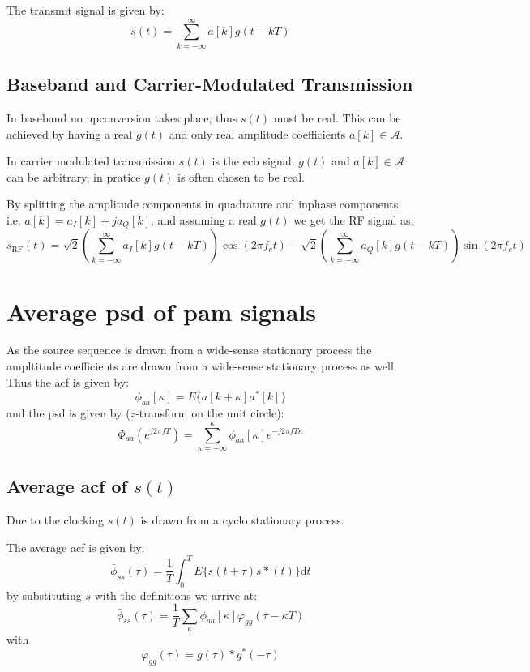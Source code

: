 The transmit signal is given by:
\begin{equation}
    s(t) = \sum_{k=-\infty}^\infty a[k] g(t - k T)
\end{equation}

\subsection{Baseband and Carrier-Modulated Transmission}
In baseband no upconversion takes place, thus $s(t)$ must be real. This can be achieved
by having a real $g(t)$ and only real amplitude coefficients $a[k] \in \mathcal{A}$.

In carrier modulated transmission $s(t)$ is the \ac{ecb} signal. $g(t)$ and
$a[k] \in \mathcal{A}$ can be arbitrary, in pratice $g(t)$ is often chosen to be real.

By splitting the amplitude components in quadrature and inphase components, i.e.
$a[k] = a_I[k] + j a_Q[k]$, and assuming a real $g(t)$  we get the RF signal as:
\begin{equation}
    s_\text{RF}(t) = \sqrt{2} \left(\sum_{k=-\infty}^\infty a_I[k] g(t-kT)
        \right) \cos(2 \pi f_c t)
        - \sqrt{2} \left(\sum_{k=-\infty}^\infty a_Q[k] g(t-kT)\right)
            \sin(2 \pi f_c t)
\end{equation}

\section{Average \acl{psd} of \acl{pam} signals}
As the source sequence is drawn from a wide-sense stationary process the ampltitude
coefficients are drawn from a wide-sense stationary process as well. Thus the
\ac{acf} is given by:
\begin{equation}
    \phi_{aa}[\kappa] = E\{a[k + \kappa] a^*[k]\}
\end{equation}
and the \ac{psd} is given by ($z$-transform on the unit circle):
\begin{equation}
    \Phi_{aa}(e^{j 2 \pi f T}) = \sum_{\kappa = -\infty}^\kappa \phi_{aa}[\kappa] e^{-j 2 \pi f T \kappa}
\end{equation}

\subsection{Average \acl{acf} of $s(t)$}
Due to the clocking $s(t)$ is drawn from a cyclo stationary process.

The average \ac{acf} is given by:
\begin{equation}
    \bar{\phi}_{ss}(\tau) = \frac{1}{T} \int_0^T E\{s(t+\tau)s*(t)\} \text{d}t
\end{equation}
by substituting $s$ with the definitions we arrive at:
\begin{equation}
    \bar{\phi}_{ss}(\tau) =  \frac{1}{T} \sum_{\kappa} \phi_{aa}[\kappa] \varphi_{gg}(\tau - \kappa T)
\end{equation}
with
\begin{equation}
    \varphi_{gg}(\tau) = g(\tau) * g^*(-\tau)
\end{equation}

